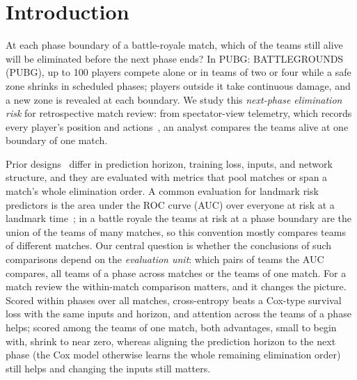 \documentclass[sigconf,anonymous]{acmart}
\begin{document}
\section{Introduction}
\label{sec:introduction}
At each phase boundary of a battle-royale match, which of the teams still alive will be eliminated before the next phase ends? In PUBG: BATTLEGROUNDS (PUBG), up to 100 players compete alone or in teams of two or four while a safe zone shrinks in scheduled phases; players outside it take continuous damage, and a new zone is revealed at each boundary. We study this \emph{next-phase elimination risk} for retrospective match review: from spectator-view telemetry, which records every player's position and actions~\cite{PUBGAPI}, an analyst compares the teams alive at one boundary of one match.

Prior designs~\cite{Sagong25a,KRAFTON} differ in prediction horizon, training loss, inputs, and network structure, and they are evaluated with metrics that pool matches or span a match's whole elimination order. A common evaluation for landmark risk predictors is the area under the ROC curve (AUC) over everyone at risk at a landmark time~\cite{vanHouwelingen07,HeagertyZheng05}; in a battle royale the teams at risk at a phase boundary are the union of the teams of many matches, so this convention mostly compares teams of different matches. Our central question is whether the conclusions of such comparisons depend on the \emph{evaluation unit}: which pairs of teams the AUC compares, all teams of a phase across matches or the teams of one match. For a match review the within-match comparison matters, and it changes the picture. Scored within phases over all matches, cross-entropy beats a Cox-type survival loss with the same inputs and horizon, and attention across the teams of a phase helps; scored among the teams of one match, both advantages, small to begin with, shrink to near zero, whereas aligning the prediction horizon to the next phase (the Cox model otherwise learns the whole remaining elimination order) still helps and changing the inputs still matters.
\end{document}
